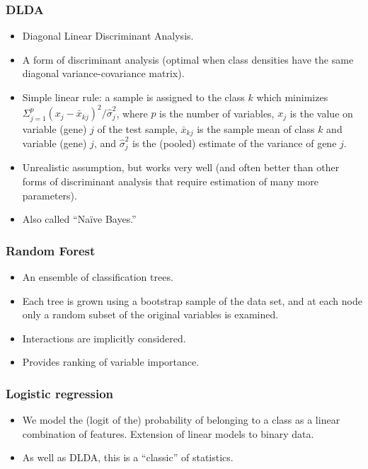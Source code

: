 \begin{frame}
\frametitle{DLDA}
\begin{itemize}
\item Diagonal Linear Discriminant Analysis.

\item A form of discriminant analysis (optimal when class densities have the same diagonal 
variance-covariance matrix).

\item Simple linear rule:  a sample is
assigned to the class $k$ which minimizes 
$\Sigma_{j = 1}^p (x_j - \bar{x}_{kj})^2/\hat{\sigma}^2_j$,
where $p$ is the number of variables, $x_j$ is the value on variable (gene) $j$ of the test
sample, $\bar{x}_{kj}$ is the sample mean of class $k$
and variable (gene) $j$, and $\hat{\sigma}^2_j$ is
the (pooled) estimate of the variance of gene $j$.
\item Unrealistic assumption, but works very well (and often better than other
  forms of discriminant analysis that require estimation of many more
  parameters).

\item Also called ``Naïve Bayes.''

\end{itemize}



\end{frame}

\begin{frame}
\frametitle{Random Forest}
\begin{itemize}
\item An ensemble of classification trees.

\item Each tree is grown using a
bootstrap sample of the data set, and at each node only a random
subset of the original variables is examined.

\item Interactions are implicitly considered.

\item Provides ranking of variable importance.
\end{itemize}
\end{frame}



\begin{frame}
\frametitle{Logistic regression}
\begin{itemize}
\item We model the (logit of the) probability of belonging to a class as a linear
combination of features. Extension of linear models to binary data.

\item As well as DLDA, this is a ``classic'' of statistics.

\end{itemize}

\end{frame}


